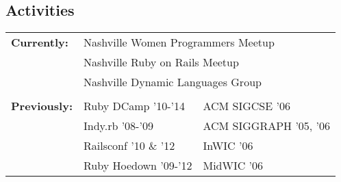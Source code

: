 \documentclass[line, margin, 10pt]{res}
\begin{document}
\begin{resume}
\section{Activities}
\begin{tabular}[t]{@{} p{1.2in} p{1.9in} p{1.9in} @{}}
\bf{Currently:}

& \multicolumn{2}{p{3.8in}}{ Nashville Women Programmers Meetup} \\
& \multicolumn{2}{p{3.8in}}{ Nashville Ruby on Rails Meetup} \\
& \multicolumn{2}{p{3.8in}}{ Nashville Dynamic Languages Group} \\
\\
\bf{Previously:}
& Ruby DCamp '10-'14 & ACM SIGCSE '06  \\
& Indy.rb '08-'09 & ACM SIGGRAPH '05, '06 \\
& Railsconf '10 \& '12 &  InWIC '06 \\
& Ruby Hoedown '09-'12 & MidWIC '06 \\
\end{tabular}
\end{resume}
\end{document}
